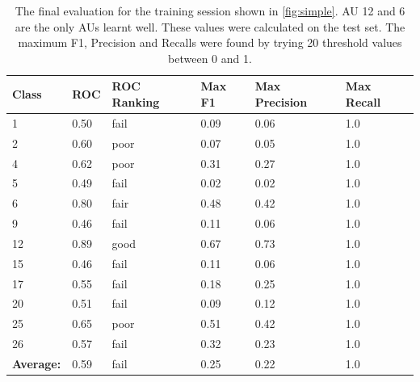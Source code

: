     \begin{table}[!h]
    \centering
    {\small
    \begin{tabular}{llllll}
    \hline
    \textbf{Class}    & \textbf{ROC} & \textbf{ROC Ranking} & \textbf{Max F1} & \textbf{Max Precision} & \textbf{Max Recall} \\ \hline
    1                 & 0.50         & fail         & 0.09            & 0.06                   & 1.0                 \\
    2                 & 0.60         & poor         & 0.07            & 0.05                   & 1.0                 \\
    4                 & 0.62         & poor         & 0.31            & 0.27                   & 1.0                 \\
    5                 & 0.49         & fail         & 0.02            & 0.02                   & 1.0                 \\
    6                 & 0.80         & fair         & 0.48            & 0.42                   & 1.0                 \\
    9                 & 0.46         & fail         & 0.11            & 0.06                   & 1.0                 \\
    12                & 0.89         & good         & 0.67            & 0.73                   & 1.0                 \\
    15                & 0.46         & fail         & 0.11            & 0.06                   & 1.0                 \\
    17                & 0.55         & fail         & 0.18            & 0.25                   & 1.0                 \\
    20                & 0.51         & fail         & 0.09            & 0.12                   & 1.0                 \\
    25                & 0.65         & poor         & 0.51            & 0.42                   & 1.0                 \\
    26                & 0.57         & fail         & 0.32            & 0.23                   & 1.0                 \\ \hline
    \textbf{Average:} & 0.59         & fail         & 0.25            & 0.22                   & 1.0                 \\ \hline
    \end{tabular} }
    \caption{The final evaluation for the training session shown in \ref{fig:simple}.
    AU 12 and 6 are the only AUs learnt well. These values were
    calculated on the test set. The maximum F1, Precision and Recalls
    were found by trying 20 threshold values between 0 and 1.}
    \label{my-label}
    \end{table}


